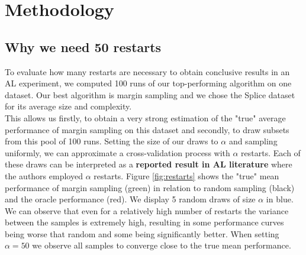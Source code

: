 \documentclass[]{article}
\begin{document}
\section{Methodology}

\subsection{Why we need 50 restarts}\label{sec:restarts}
To evaluate how many restarts are necessary to obtain conclusive results in an AL experiment, we computed 100 runs of our top-performing algorithm on one dataset.
Our best algorithm is margin sampling and we chose the Splice dataset for its average size and complexity. \\
This allows us firstly, to obtain a very strong estimation of the "true" average performance of margin sampling on this dataset and secondly, to draw subsets from this pool of 100 runs.
Setting the size of our draws to $\alpha$ and sampling uniformly, we can approximate a cross-validation process with $\alpha$ restarts.
Each of these draws can be interpreted as a \textbf{reported result in AL literature} where the authors employed $\alpha$ restarts.
Figure \ref{fig:restarts} shows the "true" mean performance of margin sampling (green) in relation to random sampling (black) and the oracle performance (red).
We display 5 random draws of size $\alpha$ in blue.
We can observe that even for a relatively high number of restarts the variance between the samples is extremely high, resulting in some performance curves being worse that random and some being significantly better.
When setting $\alpha = 50$ we observe all samples to converge close to the true mean performance. 
\end{document}
